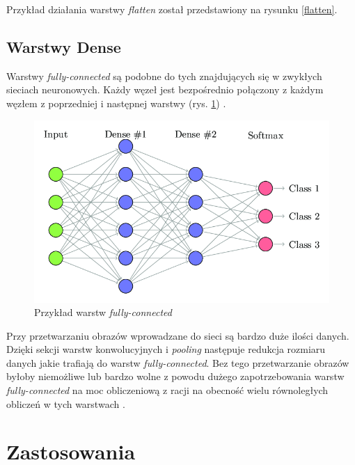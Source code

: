 \documentclass[a4paper,12pt,oneside]{book} %
\begin{document}
Przykład działania warstwy \emph{flatten} został przedstawiony na rysunku \ref{flatten}.



\subsection{Warstwy Dense}
\label{dense}
Warstwy \emph{fully-connected} są podobne do tych znajdujących się w zwykłych sieciach neuronowych. Każdy węzeł jest bezpośrednio połączony z każdym węzłem z poprzedniej i następnej warstwy (rys. \ref{fullycon}) \cite{8308186}. 

\begin{figure}[h]
	\centering
	\includegraphics[scale=0.4]{fullycon.png}
	\caption{Przykład warstw \emph{fully-connected} \cite{fullycon}}
	\label{fullycon}
\end{figure}

Przy przetwarzaniu obrazów wprowadzane do sieci są bardzo duże ilości danych. Dzięki sekcji warstw konwolucyjnych i \emph{pooling} następuje redukcja rozmiaru danych jakie trafiają do warstw \emph{fully-connected}. Bez tego przetwarzanie obrazów byłoby niemożliwe lub bardzo wolne z powodu dużego zapotrzebowania warstw \emph{fully-connected} na moc obliczeniową z racji na obecność wielu równoległych obliczeń w tych warstwach \cite{8308186}. 

\section{Zastosowania}
\end{document}
